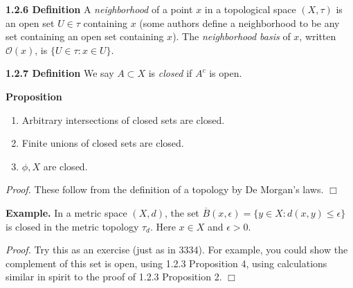 \documentclass[12pt]{article}
\newcommand{\eps}[0] {  \epsilon }
\newcommand{\curlyO}[0] { \mathcal{O} }
\begin{document}

\begin{flushleft} { \bf 1.2.6 Definition } A \emph{neighborhood} of a point $x$ in a topological space $(X, \tau)$ is an open set $U \in \tau$ containing $x$ (some authors define a neighborhood to be  any set containing an open set containing  $x$). The \emph{neighborhood basis} of $x$, written $\curlyO(x)$,  is $\{ U \in \tau :  x \in U\}$.
\end{flushleft}


\begin{flushleft} 
 { \bf 1.2.7 Definition }We say $A \subset X$ is \emph{closed} if $A^c$ is open.\end{flushleft}\begin{flushleft} 
 { \bf Proposition }\begin{enumerate}
\item
                Arbitrary intersections of closed sets are closed.
            \item
                Finite unions of closed sets are closed.
            \item
                $\phi, X$ are closed.
            \end{enumerate}\begin{flushleft} 
 \emph{Proof.  } These follow from the definition of a 
topology by De Morgan's laws. $\Box$
  \end{flushleft}\end{flushleft}\begin{flushleft} 
 { \bf Example.} In a metric space $(X, d)$, the set
$\overline{B}(x, \eps) = \{ y \in X :  d(x,y) \le \eps \}$ is 
closed in the metric topology $\tau_d$. Here $x \in X$ and $\eps > 0$.
\end{flushleft} 

\emph{Proof.  }  Try this as an exercise (just as in 3334).  For example,
you could show the complement of this set is open, using 1.2.3 Proposition 4,
using calculations similar in spirit to the proof of 1.2.3 Proposition 2.
$\Box$
\end{document}
